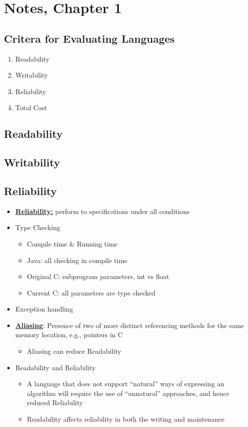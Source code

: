 \documentclass[12pt]{article}
\newcommand{\definition}[1]{\underline{\textbf{#1}}}
\begin{document}
\section*{Notes, Chapter 1}


\subsection{Critera for Evaluating Languages}

\begin{enumerate}
    \item Readability
    \item Writability
    \item Reliability
    \item Total Cost
\end{enumerate}


\subsection*{Readability}


\subsection*{Writability}


\subsection*{Reliability}

\begin{itemize}
    \item \definition{Reliability:} perform to specifications under all conditions
    \item Type Checking
    \begin{itemize}
        \item Compile time \& Running time
        \item Java: all checking in compile time
        \item Original C: subprogram parameters, int vs float
        \item Current C: all parameters are type checked
    \end{itemize}
    \item Exception handling
    \item \definition{Aliasing}: Presence of two of more distinct referencing methods for the same memory location, e.g., pointers in C
    \begin{itemize}
        \item Aliasing can reduce Readability
    \end{itemize}
    \item Readability and Reliability
    \begin{itemize}
        \item A language that does not support ``natural'' ways of expressing an algorithm will require the use of ``unnatural'' approaches, and hence reduced Reliability
        \item Readability affects reliability in both the writing and maintenance
    \end{itemize}
\end{itemize}
\end{document}
